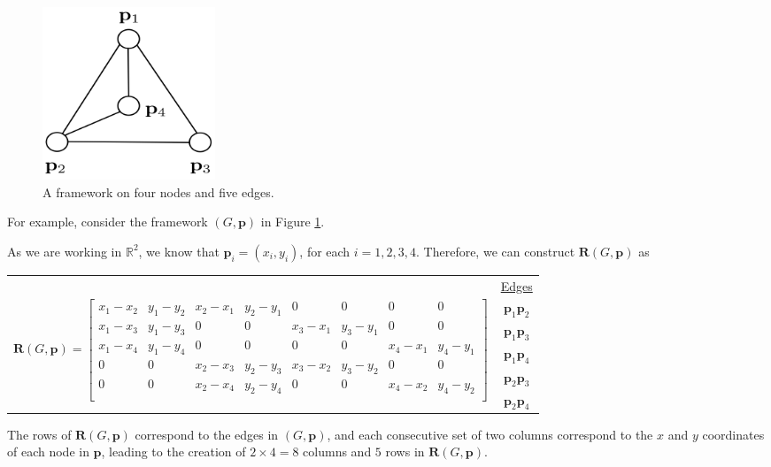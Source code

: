 \begin{figure}[htbp]
    \centering
    \includegraphics[width = 0.25\textwidth]{Chapter 3/4. rigidity_matrix.png}
    \caption{A framework on four nodes and five edges.}
    \label{fig: rigidity_matrix}
\end{figure}
\vspace{-3 mm}
\begin{flushleft}
For example, consider the framework $(G,\mathbf{p})$ in Figure \ref{fig: rigidity_matrix}. 
\end{flushleft}
\begin{flushleft}
As we are working in $\mathbb{R}^2$, we know that $\mathbf{p}_i = (x_{i}, y_{i})$, for each $i = 1,2,3,4$. Therefore, we can construct $\mathbf{R}(G,\mathbf{p})$ as
\end{flushleft}
\vspace{-6 mm}
\begin{center}
\begin{tabular}{ c c } 
 & \underline{Edges} \\
\multirow{5}{15 cm}{$
    \mathbf{R}(G,\mathbf{p}) = 
    \begin{bmatrix}
    x_1 - x_2 & y_1 - y_2 & x_2 - x_1 & y_2 - y_1 & 0 & 0 & 0 & 0 \\ %
    x_1 - x_3 & y_1 - y_3 & 0 & 0 & x_3 - x_1 & y_3 - y_1 & 0 & 0 \\ %
    x_1 - x_4 & y_1 - y_4 & 0 & 0 & 0 & 0 & x_4 - x_1 & y_4 - y_1 \\ %
    0 & 0 & x_2 - x_3 & y_2 - y_3 & x_3 - x_2 & y_3 - y_2 & 0 & 0 \\ %
    0 & 0 & x_2 - x_4 & y_2 - y_4 & 0 & 0 & x_4 - x_2 & y_4 - y_2 \\ %
    \end{bmatrix}$} & $\mathbf{p}_1\mathbf{p}_2$ \\
    & $\mathbf{p}_1\mathbf{p}_3$ \\
    & $\mathbf{p}_1\mathbf{p}_4$ \\
    & $\mathbf{p}_2\mathbf{p}_3$ \\
    & $\mathbf{p}_2\mathbf{p}_4$ \\    
\end{tabular}
\end{center}
\vspace{0.5 mm}
\begin{flushleft}
The rows of $\mathbf{R}(G,\mathbf{p})$ correspond to the edges in $(G,\mathbf{p})$, and each consecutive set of two columns correspond to the $x$ and $y$ coordinates of each node in $\mathbf{p}$, leading to the creation of $2 \times 4 = 8$ columns and $5$ rows in $\mathbf{R}(G,\mathbf{p})$.
\end{flushleft}

